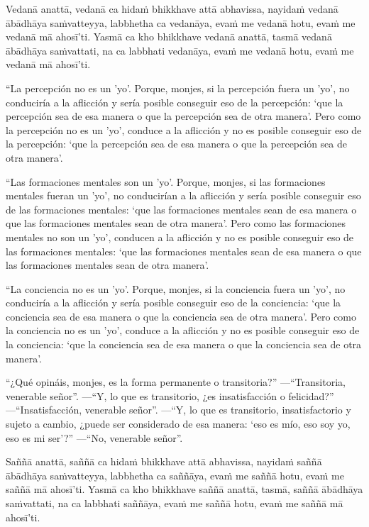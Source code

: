 Vedanā anattā, vedanā ca hidaṁ bhikkhave attā abhavissa, nayidaṁ vedanā ābādhāya
saṁvatteyya, labbhetha ca vedanāya, evaṁ me vedanā hotu, evaṁ me vedanā mā
ahosī'ti. Yasmā ca kho bhikkhave vedanā anattā, tasmā vedanā ābādhāya
saṁvattati, na ca labbhati vedanāya, evaṁ me vedanā hotu, evaṁ me vedanā mā
ahosī'ti.

\clearpage

\englishText
\markboth{\englishTitle}{\rightmark}

“La percepción no es un 'yo'. Porque, monjes, si la percepción fuera un 'yo', no conduciría a la aflicción y sería posible conseguir eso de la percepción: ‘que la percepción sea de esa manera o que la percepción sea de otra manera’. Pero como la percepción no es un 'yo', conduce a la aflicción y no es posible conseguir eso de la percepción: ‘que la percepción sea de esa manera o que la percepción sea de otra manera’.

“Las formaciones mentales son un 'yo'. Porque, monjes, si las formaciones mentales fueran un 'yo', no conducirían a la aflicción y sería posible conseguir eso de las formaciones mentales: ‘que las formaciones mentales sean de esa manera o que las formaciones mentales sean de otra manera’. Pero como las formaciones mentales no son un 'yo', conducen a la aflicción y no es posible conseguir eso de las formaciones mentales: ‘que las formaciones mentales sean de esa manera o que las formaciones mentales sean de otra manera’.

“La conciencia no es un 'yo'. Porque, monjes, si la conciencia fuera un 'yo', no conduciría a la aflicción y sería posible conseguir eso de la conciencia: ‘que la conciencia sea de esa manera o que la conciencia sea de otra manera’. Pero como la conciencia no es un 'yo', conduce a la aflicción y no es posible conseguir eso de la conciencia: ‘que la conciencia sea de esa manera o que la conciencia sea de otra manera’.

“¿Qué opináis, monjes, es la forma permanente o transitoria?”
—“Transitoria, venerable señor”.
—“Y, lo que es transitorio, ¿es insatisfacción o felicidad?”
—“Insatisfacción, venerable señor”.
—“Y, lo que es transitorio, insatisfactorio y sujeto a cambio, ¿puede ser considerado de esa manera: ‘eso es mío, eso soy yo, eso es mi ser’?”
—“No, venerable señor”.



\clearpage

\paliText
\markboth{\paliTitle}{\rightmark}

Saññā anattā, saññā ca hidaṁ bhikkhave attā abhavissa, nayidaṁ saññā ābādhāya
saṁvatteyya, labbhetha ca saññāya, evaṁ me saññā hotu, evaṁ me saññā mā
ahosī'ti. Yasmā ca kho bhikkhave saññā anattā, tasmā, saññā ābādhāya saṁvattati,
na ca labbhati saññāya, evaṁ me saññā hotu, evaṁ me saññā mā ahosī'ti.

